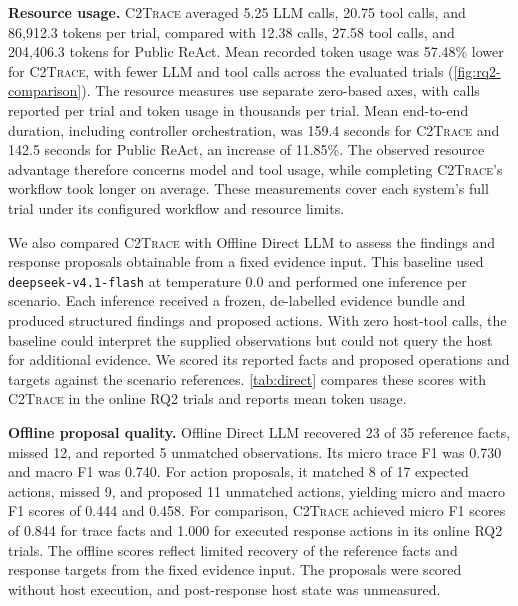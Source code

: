 \documentclass[pdflatex,sn-basic]{sn-jnl}
\newcommand{\system}{\textsc{C2Trace}\xspace}
\begin{document}
\noindent\textbf{Resource usage.} \system averaged 5.25 LLM calls, 20.75 tool calls, and 86,912.3 tokens per trial, compared with 12.38 calls, 27.58 tool calls, and 204,406.3 tokens for Public ReAct. Mean recorded token usage was 57.48\% lower for \system, with fewer LLM and tool calls across the evaluated trials (\autoref{fig:rq2-comparison}). The resource measures use separate zero-based axes, with calls reported per trial and token usage in thousands per trial. Mean end-to-end duration, including controller orchestration, was 159.4 seconds for \system and 142.5 seconds for Public ReAct, an increase of 11.85\%. The observed resource advantage therefore concerns model and tool usage, while completing \system's workflow took longer on average. These measurements cover each system's full trial under its configured workflow and resource limits.

We also compared \system with Offline Direct LLM to assess the findings and response proposals obtainable from a fixed evidence input. This baseline used \texttt{deepseek-v4.1-flash} at temperature 0.0 and performed one inference per scenario. Each inference received a frozen, de-labelled evidence bundle and produced structured findings and proposed actions. With zero host-tool calls, the baseline could interpret the supplied observations but could not query the host for additional evidence. We scored its reported facts and proposed operations and targets against the scenario references. \autoref{tab:direct} compares these scores with \system in the online RQ2 trials and reports mean token usage.

\noindent\textbf{Offline proposal quality.} Offline Direct LLM recovered 23 of 35 reference facts, missed 12, and reported 5 unmatched observations. Its micro trace F1 was 0.730 and macro F1 was 0.740. For action proposals, it matched 8 of 17 expected actions, missed 9, and proposed 11 unmatched actions, yielding micro and macro F1 scores of 0.444 and 0.458. For comparison, \system achieved micro F1 scores of 0.844 for trace facts and 1.000 for executed response actions in its online RQ2 trials. The offline scores reflect limited recovery of the reference facts and response targets from the fixed evidence input. The proposals were scored without host execution, and post-response host state was unmeasured. 
\end{document}
